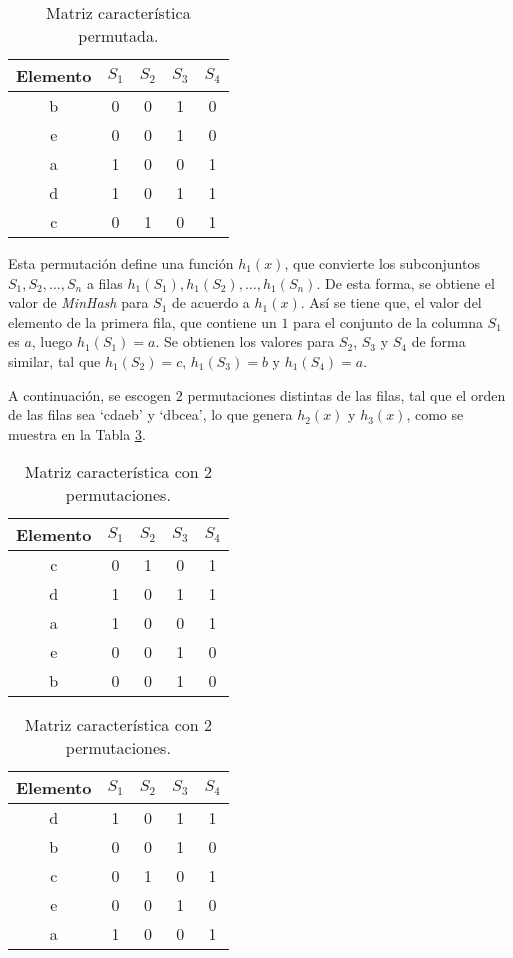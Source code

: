 \begin{table}[h]
\caption{Matriz característica permutada.}
\label{tab:conjuntoejemplo2}
\small
\centering
\begin{tabular}{ccccc}
\hline
{Elemento} & {$S_1$} & {$S_2$} & {$S_3$} & {$S_4$} \\
\hline
b & 0 & 0 & 1 & 0 \\
e & 0 & 0 & 1 & 0 \\
a & 1 & 0 & 0 & 1 \\
d & 1 & 0 & 1 & 1 \\
c & 0 & 1 & 0 & 1 \\
\hline
\end{tabular}
\end{table}

Esta permutación define una función  $h_1(x)$,
que convierte los subconjuntos $S_1, S_2, \ldots, S_n$ a filas 
$h_1(S_1), h_1(S_2), \ldots, h_1(S_n)$.
De esta forma, se obtiene el valor de \textit{MinHash} para $S_1$ de acuerdo a $h_1(x)$.
Así se tiene que, el valor del elemento de la primera fila,
que contiene un $1$ para el conjunto de la columna $S_1$ es $a$,
luego $h_1(S_1) = a$. Se obtienen los valores para $S_2$, $S_3$ y $S_4$ de forma similar,
tal que $h_1(S_2) = c$, $h_1(S_3) = b$ y $h_1(S_4) = a$.

A continuación, se escogen $2$ permutaciones distintas de las filas,
tal que el orden de las filas sea ‘cdaeb’ y ‘dbcea’, lo que genera $h_2(x)$ y $h_3(x)$,
como se muestra en la Tabla \ref{tab:conjuntoejemplo3}.

\begin{table}[h]
\caption{Matriz característica con 2 permutaciones.}
\label{tab:conjuntoejemplo3}
\small
\centering
\begin{tabular}{ccccc}
\hline
{Elemento} & {$S_1$} & {$S_2$} & {$S_3$} & {$S_4$} \\
\hline
c & 0 & 1 & 0 & 1 \\
d & 1 & 0 & 1 & 1 \\
a & 1 & 0 & 0 & 1 \\
e & 0 & 0 & 1 & 0 \\
b & 0 & 0 & 1 & 0 \\
\hline
\end{tabular}
\quad
\begin{tabular}{ccccc}
\hline
{Elemento} & {$S_1$} & {$S_2$} & {$S_3$} & {$S_4$} \\
\hline
d & 1 & 0 & 1 & 1 \\
b & 0 & 0 & 1 & 0 \\
c & 0 & 1 & 0 & 1 \\
e & 0 & 0 & 1 & 0 \\
a & 1 & 0 & 0 & 1 \\
\hline
\end{tabular}
\end{table}

